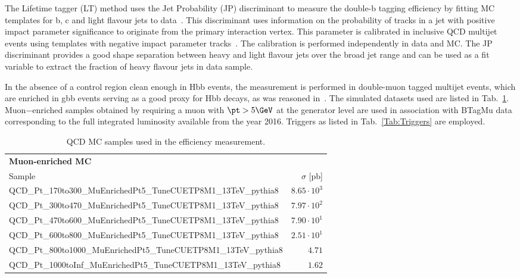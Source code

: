 The Lifetime tagger (LT) method uses the Jet Probability (JP) discriminant to measure the double-b tagging efficiency by fitting MC templates for b, c and light flavour jets to data~\cite{Ref:LT}. This discriminant uses information on the probability of tracks in a jet with positive impact parameter significance to originate from the primary interaction vertex. This parameter is calibrated in inclusive QCD multijet events using templates with negative impact parameter tracks~\cite{Ref:JP}. The calibration is performed independently in data and MC. The JP discriminant provides a good shape separation between heavy and light flavour jets over the broad jet \pt range and can be used as a fit variable to extract the fraction of heavy flavour jets in data sample.

In the absence of a control region clean enough in Hbb events, the measurement is performed in double-muon tagged multijet events, which are enriched in gbb events serving as a good proxy for Hbb decays, as was reasoned in~\cite{CMS-PAS-BTV-15-002}. The simulated datasets used are listed in Tab.~\ref{Tab:QCDMultijet}. Muon−enriched samples obtained by requiring a muon with $\pt> 5\GeV$ at the generator level are used in association with BTagMu data corresponding to the full integrated luminosity available from the year 2016. Triggers as listed in Tab.~\ref{Tab:Triggers} are employed.




\begin{table}[htb]
 \begin{center}
\footnotesize
  \caption{QCD MC samples used in the efficiency measurement.}
\begin{tabular}{lr}
\hline\hline
{\bf Muon-enriched MC} & \\
\vspace{2mm} Sample & $\sigma $ [pb]  \\
\hline
QCD\_Pt\_170to300\_MuEnrichedPt5\_TuneCUETP8M1\_13TeV\_pythia8 & $8.65 \cdot 10^3$ \\
QCD\_Pt\_300to470\_MuEnrichedPt5\_TuneCUETP8M1\_13TeV\_pythia8 & $7.97 \cdot 10^2$ \\
QCD\_Pt\_470to600\_MuEnrichedPt5\_TuneCUETP8M1\_13TeV\_pythia8 & $7.90 \cdot 10^1$ \\
QCD\_Pt\_600to800\_MuEnrichedPt5\_TuneCUETP8M1\_13TeV\_pythia8 & $2.51 \cdot 10^1$ \\
QCD\_Pt\_800to1000\_MuEnrichedPt5\_TuneCUETP8M1\_13TeV\_pythia8 & $4.71$ \\
QCD\_Pt\_1000toInf\_MuEnrichedPt5\_TuneCUETP8M1\_13TeV\_pythia8 & $1.62$ \\
\hline
\end{tabular}
\normalsize
  \label{Tab:QCDMultijet}
\end{center}
\end{table}

